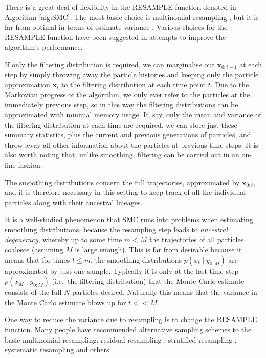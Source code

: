 \documentclass{article}
\begin{document}
There is a great deal of flexibility in the {\footnotesize RESAMPLE} function denoted in Algorithm \ref{alg:SMC}. The most basic choice is multinomial resampling \citep{efron1994}, but it is far from optimal in terms of estimate variance \citep{douc2005}. Various choices for the {\footnotesize RESAMPLE} function have been suggested in attempts to improve the algorithm's performance.

If only the filtering distribution is required, we can marginalise out $\mathbf{x}_{0:t-1}$ at each step by simply throwing away the particle histories and keeping only the particle approximation $\mathbf{x}_{t}$ to the filtering distribution at each time point $t$. Due to the Markovian progress of the algorithm, we only ever refer to the particles at the immediately previous step, so in this way the filtering distributions can be approximated with minimal memory usage. If, say, only the mean and variance of the filtering distribution at each time are required, we can store just these summary statistics, plus the current and previous generations of particles, and throw away all other information about the particles at previous time steps. It is also worth noting that, unlike smoothing, filtering can be carried out in an on-line fashion.

The smoothing distributions concern the full trajectories, approximated by $\mathbf{x}_{0:t}$, and it is therefore necessary in this setting to keep track of all the individual particles along with their ancestral lineages.

It is a well-studied phenomenon that SMC runs into problems when estimating smoothing distributions, because the resampling step leads to \emph{ancestral degeneracy}, whereby up to some time $m<M$ the trajectories of all particles coalesce (assuming $M$ is large enough). This is far from desirable because it means that for times $t\leq m$, the smoothing distributions $p(x_t \mid y_{0:M})$ are approximated by just one sample. Typically it is only at the last time step $p(x_M \mid y_{0:M})$ (i.e.\ the filtering distribution) that the Monte Carlo estimate consists of the full $N$ particles desired. Naturally this means that the variance in the Monte Carlo estimate blows up for $t<<M$.

One way to reduce the variance due to resampling is to change the {\footnotesize RESAMPLE} function.
Many people have recommended alternative sampling schemes to the basic multinomial resampling: residual resampling \citep{liu1998}, stratified resampling \citep{kitagawa1996}, systematic resampling \citep{carpenter1999} and others.
\end{document}
